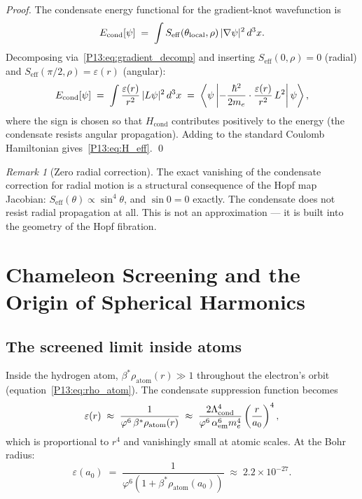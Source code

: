 \documentclass[11pt,a4paper]{article}
\theoremstyle{definition}
\theoremstyle{remark}
\newtheorem{remark}[theorem]{Remark}
\newcommand{\vp}{\varphi}
\newcommand{\bst}{\beta^{*}}
\newcommand{\Lcond}{\Lambda_{\mathrm{cond}}}
\newcommand{\aem}{\alpha_{\mathrm{em}}}
\newcommand{\eps}{\varepsilon}
\newcommand{\Hcond}{H_{\mathrm{cond}}}
\newcommand{\rhoa}{\rho_{\mathrm{atom}}}
\newcommand{\Seff}{S_{\mathrm{eff}}}
\newcommand{\epsr}{\varepsilon(r)}
\begin{document}
\begin{proof}
The condensate energy functional for the gradient-knot wavefunction is
\[
  E_{\rm cond}[\psi]
  \;=\; \int \Seff(\theta_{\rm local},\rho)\,|\nabla\psi|^2\,d^3x.
\]
Decomposing via~\eqref{P13:eq:gradient_decomp} and inserting
$\Seff(0,\rho)=0$ (radial) and $\Seff(\pi/2,\rho)=\epsr$ (angular):
\[
  E_{\rm cond}[\psi]
  \;=\; \int \frac{\epsr}{r^2}\,|L\psi|^2\,d^3x
  \;=\; \left\langle\psi\left|
    -\frac{\hbar^2}{2m_e}\cdot\frac{\epsr}{r^2}\,L^2
    \right|\psi\right\rangle,
\]
where the sign is chosen so that $\Hcond$ contributes positively
to the energy (the condensate resists angular propagation).
Adding to the standard Coulomb Hamiltonian gives~\eqref{P13:eq:H_eff}.
\qed
\end{proof}

\begin{remark}[Zero radial correction]
\label{P13:rem:zero_radial}
The exact vanishing of the condensate correction for radial motion
is a structural consequence of the Hopf map Jacobian:
$\Seff(\theta)\propto\sin^4\!\theta$, and $\sin\!0=0$ exactly.
The condensate does not resist radial propagation at all.
This is not an approximation --- it is built into the geometry
of the Hopf fibration.
\end{remark}

\section{Chameleon Screening and the Origin of Spherical Harmonics}
\label{P13:sec:chameleon}

\subsection{The screened limit inside atoms}

Inside the hydrogen atom, $\bst\rhoa(r)\gg1$ throughout the
electron's orbit (equation~\eqref{P13:eq:rho_atom}).
The condensate suppression function becomes
\begin{equation}
  \epsr
  \;\approx\; \frac{1}{\vp^6\,\bst\rho_{\rm atom}(r)}
  \;\approx\; \frac{2\Lcond^4}{\vp^6\,\aem^6 m_e^4}
        \left(\frac{r}{a_0}\right)^4,
  \label{P13:eq:eps_chameleon}
\end{equation}
which is proportional to $r^4$ and vanishingly small at atomic scales.
At the Bohr radius:
\begin{equation}
  \boxed{\eps(a_0)
  \;=\; \frac{1}{\vp^6(1+\bst\rhoa(a_0))}
  \;\approx\; 2.2\times10^{-27}.}
  \label{P13:eq:eps_a0_value}
\end{equation}
\end{document}
